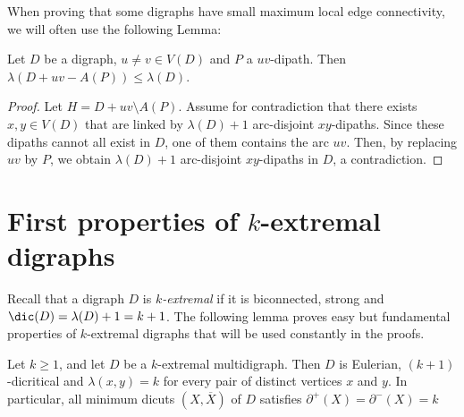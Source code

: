 When proving that some digraphs have small maximum local edge connectivity, we will often use the following Lemma:

\begin{lemma}\label{lem:lambda_diminishing}
    Let $D$ be a digraph, $u \neq v \in V(D)$ and $P$ a $uv$-dipath. Then $\lambda(D + uv - A(P)) \leq \lambda(D)$.
\end{lemma}

\begin{proof}
    Let  $H = D + uv \setminus A(P)$. 
    Assume for contradiction that there exists $x,y \in V(D)$ that are linked by $\lambda(D)+1$ arc-disjoint $xy$-dipaths.  Since these dipaths cannot all exist in $D$, one of them contains the arc $uv$. Then, by replacing $uv$ by $P$, we obtain $\lambda(D)+1$ arc-disjoint $xy$-dipaths in $D$, a contradiction. 
\end{proof}



\section{First properties of $k$-extremal digraphs}\label{sec:kextr}

Recall that a digraph $D$ is \emph{$k$-extremal} if it is biconnected, strong and $\dic(D) = \lambda(D) + 1 = k+1$. 
The following lemma proves easy but fundamental properties of $k$-extremal digraphs that will be used constantly in the proofs. 

\begin{lemma}\label{lem:prop_k-extremal}
    Let $k \geq 1$, and let $D$ be a $k$-extremal multidigraph. Then $D$ is Eulerian, $(k+1)$-dicritical and $\lambda(x,y)=k$ for every pair of distinct vertices $x$ and $y$. 
    In particular, all minimum dicuts $(X, \overline{X})$ of $D$ satisfies $\partial^+(X) = \partial^-(X) =k$
\end{lemma}

